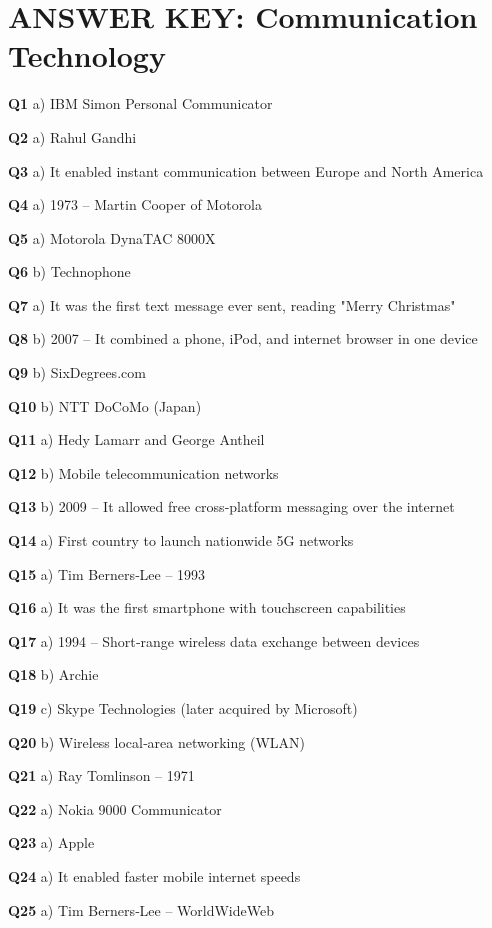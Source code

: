 \section{ANSWER KEY: Communication Technology}

\textbf{Q1} a) IBM Simon Personal Communicator\par
\textbf{Q2} a) Rahul Gandhi\par
\textbf{Q3} a) It enabled instant communication between Europe and North America\par
\textbf{Q4} a) 1973 – Martin Cooper of Motorola\par
\textbf{Q5} a) Motorola DynaTAC 8000X\par
\textbf{Q6} b) Technophone\par
\textbf{Q7} a) It was the first text message ever sent, reading "Merry Christmas"\par
\textbf{Q8} b) 2007 – It combined a phone, iPod, and internet browser in one device\par
\textbf{Q9} b) SixDegrees.com\par
\textbf{Q10} b) NTT DoCoMo (Japan)\par
\textbf{Q11} a) Hedy Lamarr and George Antheil\par
\textbf{Q12} b) Mobile telecommunication networks\par
\textbf{Q13} b) 2009 – It allowed free cross‑platform messaging over the internet\par
\textbf{Q14} a) First country to launch nationwide 5G networks\par
\textbf{Q15} a) Tim Berners‑Lee – 1993\par
\textbf{Q16} a) It was the first smartphone with touchscreen capabilities\par
\textbf{Q17} a) 1994 – Short‑range wireless data exchange between devices\par
\textbf{Q18} b) Archie\par
\textbf{Q19} c) Skype Technologies (later acquired by Microsoft)\par
\textbf{Q20} b) Wireless local‑area networking (WLAN)\par
\textbf{Q21} a) Ray Tomlinson – 1971\par
\textbf{Q22} a) Nokia 9000 Communicator\par
\textbf{Q23} a) Apple\par
\textbf{Q24} a) It enabled faster mobile internet speeds\par
\textbf{Q25} a) Tim Berners‑Lee – WorldWideWeb\par
